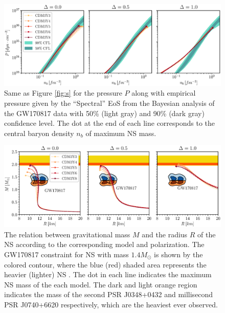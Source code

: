 \begin{figure}[ht!]
        \centering
        \includegraphics[width=\textwidth]{fig/P.eps}
        \caption{Same as Figure \ref{fig:s} for the pressure $P$ along with empirical pressure given by the ``Spectral'' \gls{EoS} from the Bayesian analysis of the GW170817 data \citep{abbott2018gw170817} with 50\% (light gray) and 90\% (dark gray) confidence level. The dot at the end of each line corresponds to the central baryon density $n_b$ of maximum \gls{NS} mass.}
        \label{fig:p}
\end{figure} 
\begin{figure}[ht!]
        \centering
        \includegraphics[width=\textwidth]{fig/MR.eps}
        \caption{The relation between gravitational mass $M$ and the radius $R$ of the \gls{NS} according to the corresponding model and polarization. The GW170817 constraint for \gls{NS} with mass $1.4M_\odot$ is shown by the colored contour, where the blue (red) shaded area represents the heavier (lighter) \gls{NS} \citep{abbott2018gw170817}. The dot in each line indicates the maximum \gls{NS} mass of the each model. The dark and light orange region indicates the mass of the second \gls{PSR} J0348+0432 \citep{antoniadis2013massive} and millisecond \gls{PSR} J0740+6620 \citep{cromartie2020relativistic} respectively, which are the heaviest  ever observed.}
        \label{fig:mr}
\end{figure} 
